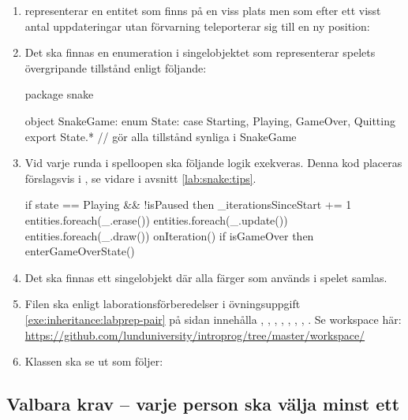 \begin{enumerate}[label={$\square$}, leftmargin=*]
\item {} representerar en entitet som finns på en viss plats men som efter ett visst antal uppdateringar utan förvarning teleporterar sig till en ny position:

\item Det ska finnas en enumeration  i singelobjektet  som representerar spelets övergripande tillstånd enligt följande:
\begin{Code}
package snake 

object SnakeGame:
  enum State:
    case Starting, Playing, GameOver, Quitting
  export State.* // gör alla tillstånd synliga i SnakeGame
\end{Code}

\item Vid varje runda i spelloopen ska följande logik exekveras. Denna kod placeras förslagsvis i , se vidare  i avsnitt \ref{lab:snake:tips}.
\begin{Code}
    if state == Playing && !isPaused then
      _iterationsSinceStart += 1
      entities.foreach(_.erase())
      entities.foreach(_.update())
      entities.foreach(_.draw())
      onIteration()
      if isGameOver then enterGameOverState()
\end{Code}

\item Det ska finnas ett singelobjekt  där alla färger som används i spelet samlas.

\item Filen  ska enligt laborationsförberedelser i övningsuppgift   \ref{exe:inheritance:labprep-pair} på sidan \pageref{exe:inheritance:labprep-pair} innehålla
, , , , , , , . Se workspace här:\\
\url{https://github.com/lunduniversity/introprog/tree/master/workspace/}

\item Klassen  ska se ut som följer:

\end{enumerate}





\subsection{Valbara krav -- varje person ska välja minst ett}\label{lab:snake:extra-reqts}

